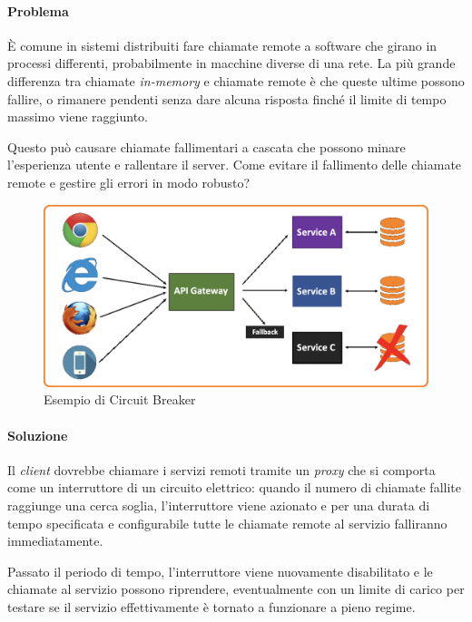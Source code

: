 \paragraph*{Problema} È comune in sistemi distribuiti fare chiamate remote a software che girano in processi differenti, probabilmente in macchine diverse di una rete.
La più grande differenza tra chiamate \textit{in-memory} e chiamate remote è che queste ultime possono fallire, o rimanere pendenti senza dare alcuna risposta finché il limite di tempo massimo viene raggiunto.

Questo può causare chiamate fallimentari a cascata che possono minare l'esperienza utente e rallentare il server. Come evitare il fallimento delle chiamate remote e gestire gli errori in modo robusto?

\begin{figure}[H]
	\centering
	\includegraphics[width=\textwidth]{immagini/circuit-breaker.png}
	\caption[Esempio di Circuit Breaker]{Esempio di Circuit Breaker\footnotemark}
\end{figure}

\paragraph*{Soluzione} Il \textit{client} dovrebbe chiamare i servizi remoti tramite un \textit{proxy} che si comporta come un interruttore di un circuito elettrico: quando il numero di chiamate fallite raggiunge una cerca soglia, l'interruttore viene azionato e per una durata di tempo specificata e configurabile tutte le chiamate remote al servizio falliranno immediatamente.

Passato il periodo di tempo, l'interruttore viene nuovamente disabilitato e le chiamate al servizio possono riprendere, eventualmente con un limite di carico per testare se il servizio effettivamente è tornato a funzionare a pieno regime.
